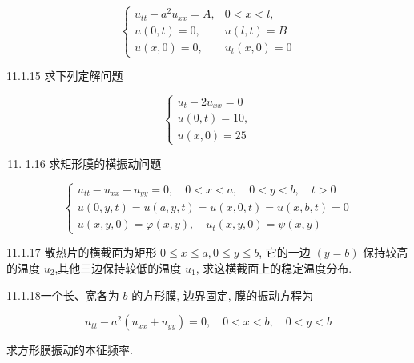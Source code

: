 $$
\begin{cases}u_{t t}-a^{2} u_{x x}=A, & 0<x<l, \\ u(0, t)=0, & u(l, t)=B \\ u(x, 0)=0, & u_{t}(x, 0)=0\end{cases}
$$

11.1.15 求下列定解问题

$$
\left\{\begin{array}{l}
u_{t}-2 u_{x x}=0 \\
u(0, t)=10, \\
u(x, 0)=25
\end{array}\right.
$$

\begin{enumerate}
  \setcounter{enumi}{10}
  \item 1.16 求矩形膜的横振动问题
\end{enumerate}

$$
\left\{\begin{array}{l}
u_{t t}-u_{x x}-u_{y y}=0, \quad 0<x<a, \quad 0<y<b, \quad t>0 \\
u(0, y, t)=u(a, y, t)=u(x, 0, t)=u(x, b, t)=0 \\
u(x, y, 0)=\varphi(x, y), \quad u_{t}(x, y, 0)=\psi(x, y)
\end{array}\right.
$$

11.1.17 散热片的横截面为矩形 $0 \leqslant x \leqslant a, 0 \leqslant y \leqslant b$, 它的一边 $(y=b)$ 保持较高的温度 $u_{2}$,其他三边保持较低的温度 $u_{1}$, 求这横截面上的稳定温度分布.

11.1.18一个长、宽各为 $b$ 的方形膜, 边界固定, 膜的振动方程为

$$
u_{t t}-a^{2}\left(u_{x x}+u_{y y}\right)=0, \quad 0<x<b, \quad 0<y<b
$$

求方形膜振动的本征频率.